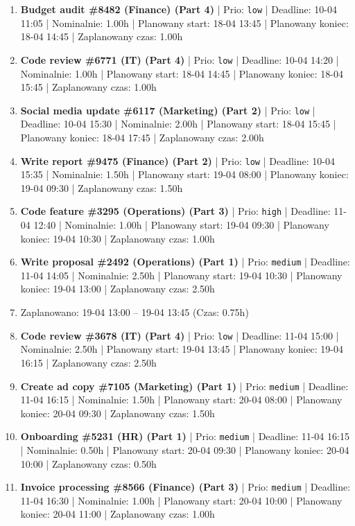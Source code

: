 {\begin{enumerate}
  \item [\textbf{14694}] \textbf{Budget audit \#8482 (Finance) (Part 4)} | Prio: \texttt{low} | Deadline: 10-04 11:05 | Nominalnie: 1.00h | Planowany start: 18-04 13:45 | Planowany koniec: 18-04 14:45 | Zaplanowany czas: 1.00h
  \item [\textbf{14681}] \textbf{Code review \#6771 (IT) (Part 4)} | Prio: \texttt{low} | Deadline: 10-04 14:20 | Nominalnie: 1.00h | Planowany start: 18-04 14:45 | Planowany koniec: 18-04 15:45 | Zaplanowany czas: 1.00h
  \item [\textbf{14700}] \textbf{Social media update \#6117 (Marketing) (Part 2)} | Prio: \texttt{low} | Deadline: 10-04 15:30 | Nominalnie: 2.00h | Planowany start: 18-04 15:45 | Planowany koniec: 18-04 17:45 | Zaplanowany czas: 2.00h
  \item [\textbf{14685}] \textbf{Write report \#9475 (Finance) (Part 2)} | Prio: \texttt{low} | Deadline: 10-04 15:35 | Nominalnie: 1.50h | Planowany start: 19-04 08:00 | Planowany koniec: 19-04 09:30 | Zaplanowany czas: 1.50h
  \item [\textbf{14608}] \textbf{Code feature \#3295 (Operations) (Part 3)} | Prio: \texttt{high} | Deadline: 11-04 12:40 | Nominalnie: 1.00h | Planowany start: 19-04 09:30 | Planowany koniec: 19-04 10:30 | Zaplanowany czas: 1.00h
  \item [\textbf{14668}] \textbf{Write proposal \#2492 (Operations) (Part 1)} | Prio: \texttt{medium} | Deadline: 11-04 14:05 | Nominalnie: 2.50h | Planowany start: 19-04 10:30 | Planowany koniec: 19-04 13:00 | Zaplanowany czas: 2.50h
  \item [\textbf{PRZERWA}] Zaplanowano: 19-04 13:00 -- 19-04 13:45 (Czas: 0.75h)
  \item [\textbf{14699}] \textbf{Code review \#3678 (IT) (Part 4)} | Prio: \texttt{low} | Deadline: 11-04 15:00 | Nominalnie: 2.50h | Planowany start: 19-04 13:45 | Planowany koniec: 19-04 16:15 | Zaplanowany czas: 2.50h
  \item [\textbf{14650}] \textbf{Create ad copy \#7105 (Marketing) (Part 1)} | Prio: \texttt{medium} | Deadline: 11-04 16:15 | Nominalnie: 1.50h | Planowany start: 20-04 08:00 | Planowany koniec: 20-04 09:30 | Zaplanowany czas: 1.50h
  \item [\textbf{14671}] \textbf{Onboarding \#5231 (HR) (Part 1)} | Prio: \texttt{medium} | Deadline: 11-04 16:15 | Nominalnie: 0.50h | Planowany start: 20-04 09:30 | Planowany koniec: 20-04 10:00 | Zaplanowany czas: 0.50h
  \item [\textbf{14675}] \textbf{Invoice processing \#8566 (Finance) (Part 3)} | Prio: \texttt{medium} | Deadline: 11-04 16:30 | Nominalnie: 1.00h | Planowany start: 20-04 10:00 | Planowany koniec: 20-04 11:00 | Zaplanowany czas: 1.00h

\end{enumerate}}
